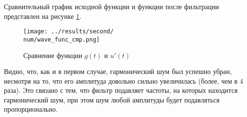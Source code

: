 Сравнительный график исходной функции и функции после фильтрации представлен на рисунке \ref{fig:wave_func_cmp_\num}.

\begin{figure}[ht!]
    \centering
    \texttt{[image: ../results/second/\\num/wave\_func\_cmp.png]}
    \caption{Сравнение функции $g(t)$ и $u'(t)$}
    \label{fig:wave_func_cmp_\num}
\end{figure}

Видно, что, как и в первом случае, гармонический шум был успешно убран, несмотря на то, 
что его амплитуда довольно сильно увеличилась (более, чем в 4 раза). Это связано с тем, что 
фильтр подавляет частоты, на которых находится гармонический шум, при этом шум любой амплитуды
будет подавляться пропорционально. 